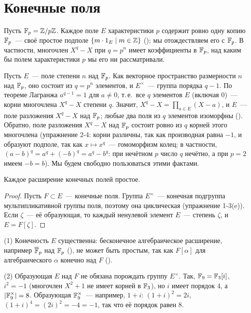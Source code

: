 \makeatletter
{}
\makeatother
\section{Конечные поля}

Пусть $\mathbb F_p=\mathbb Z/p\mathbb Z$. Каждое поле $E$ характеристики $p$ содержит ровно одну копию $\mathbb F_p$~--- своё простое подполе
$\{m\cdot1_E\mid m\in\mathbb Z\}$ (); мы отождествляем его с $\mathbb F_p$. В частности, многочлен $X^q-X$ при $q=p^n$ имеет
коэффициенты в $\mathbb F_p$, над каким бы полем характеристики $p$ мы его ни рассматривали.

Пусть $E$~--- поле степени $n$ над $\mathbb F_p$. Как векторное пространство размерности $n$ над $\mathbb F_p$, оно состоит из
$q=p^n$ элементов, и $E^\times$~--- группа порядка $q-1$. По теореме Лагранжа $a^{q-1}=1$ для $a\ne0$, т.\,е.\ все $q$
элементов $E$ (включая $0$)~--- корни многочлена $X^q-X$ степени $q$. Значит, $X^q-X=\prod_{a\in E}(X-a)$, и $E$~--- поле
разложения $X^q-X$ над $\mathbb F_p$; любые два поля из $q$ элементов изоморфны (). Обратно, поле разложения $X^q-X$
над $\mathbb F_p$ состоит ровно из $q$ корней этого многочлена (упражнение 2-4: корни различны, так как производная равна
$-1$, и образуют подполе, так как $x\mapsto x^q$~--- гомоморфизм колец; в частности, $(a-b)^q=a^q+(-b)^q=a^q-b^q$:
при нечётном $p$ число $q$ нечётно, а при $p=2$ имеем $-b=b$). Мы будем свободно пользоваться этими фактами.

\begin{proposition}[4.19]
Каждое расширение конечных полей простое.
\end{proposition}

\begin{proof}
Пусть $F\subset E$~--- конечные поля. Группа $E^\times$~--- конечная подгруппа мультипликативной группы поля, поэтому
она циклическая (упражнение 1-3(e)). Если $\zeta$~--- её образующая, то каждый ненулевой элемент $E$~--- степень
$\zeta$, и $E=F[\zeta]$.
\end{proof}

\begin{remark}[4.19a]
(1) Конечность $E$ существенна: бесконечное алгебраическое расширение, например $\overline{\mathbb F}_p$ над $\mathbb F_p$ (), не может быть
простым, так как $F[\alpha]$ для алгебраического $\alpha$ конечно над $F$ ().

(2) Образующая $E$ над $F$ не обязана порождать группу $E^\times$. Так, $\mathbb F_9=\mathbb F_3[i]$, $i^2=-1$ (многочлен $X^2+1$ не
имеет корней в $\mathbb F_3$), но $i$ имеет порядок $4$, а $|\mathbb F_9^\times|=8$. Образующая $\mathbb F_9^\times$~--- например, $1+i$:
$(1+i)^2=2i$, $(1+i)^4=(2i)^2=-4=-1$, так что её порядок равен $8$.
\end{remark}

